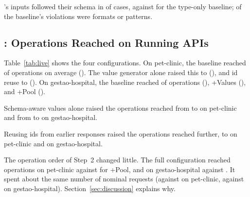 \begin{observation}
\label{obs:conform}
\tool's  inputs followed their schema in \NConfTool of cases,
against \NConfBaseline for the type-only baseline;
\NViolBaselineFormatPattern of the baseline's violations were formats or
patterns.
\end{observation}

\subsection{: Operations Reached on Running APIs}
\label{sec:rq3}



Table~\ref{tab:live} shows the four configurations. On pet-clinic, the
baseline reached \NPetclinicBaselineOps of \NPetclinicOps operations on
average (\NPetclinicBaselineCov). The value generator alone raised this to
\NPetclinicValuesOps (\NPetclinicValuesCov), and id reuse to
\NPetclinicValuesPlusPoolOps (\NPetclinicValuesPlusPoolCov). On
gestao-hospital, the baseline reached \NGestaohospitalBaselineOps of
\NGestaohospitalOps operations (\NGestaohospitalBaselineCov), +Values
\NGestaohospitalValuesOps (\NGestaohospitalValuesCov), and +Pool
\NGestaohospitalValuesPlusPoolOps (\NGestaohospitalValuesPlusPoolCov).

\begin{observation}
\label{obs:values}
Schema-aware values alone raised the operations reached from
\NPetclinicBaselineCov to \NPetclinicValuesCov on pet-clinic and from
\NGestaohospitalBaselineCov to \NGestaohospitalValuesCov on
gestao-hospital.
\end{observation}

\begin{observation}
\label{obs:pool}
Reusing ids from earlier responses raised the operations reached further, to
\NPetclinicValuesPlusPoolCov on pet-clinic and
\NGestaohospitalValuesPlusPoolCov on gestao-hospital.
\end{observation}

The operation order of Step~2 changed little. The full configuration reached
\NPetclinicFullOps operations on pet-clinic against
\NPetclinicValuesPlusPoolOps for +Pool, and \NGestaohospitalFullOps on
gestao-hospital against \NGestaohospitalValuesPlusPoolOps. It spent about
the same number of nominal requests (\NPetclinicFullNominal against
\NPetclinicValuesPlusPoolNominal on pet-clinic, \NGestaohospitalFullNominal
against \NGestaohospitalValuesPlusPoolNominal on gestao-hospital).
Section~\ref{sec:discussion} explains why.

